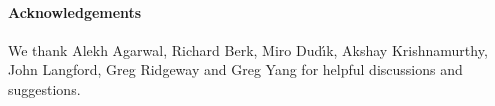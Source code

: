 \documentclass[11pt]{article}
\begin{document}
\thispagestyle{empty} \setcounter{page}{0}
\clearpage












\paragraph*{Acknowledgements}
We thank Alekh Agarwal, Richard Berk, Miro Dud{\'\i}k, Akshay
Krishnamurthy, John Langford, Greg Ridgeway and Greg Yang for helpful
discussions and suggestions.






\appendix


\end{document}
